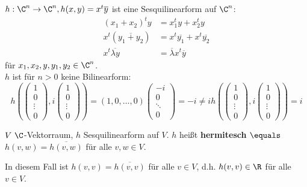 \documentclass{article}
\begin{document}
    \begin{bsp}
        \label{examplesesqui}
        $h: \C^n \to \C ^n, h(x, y) = x^t \overline{y}$ ist eine Sesquilinearform auf $\C^n$:
        \begin{align*}
            (x_1 + x_2)^t y &= x_1^t y+ x_2^t y\\
            x^t(\overline{y_1 + y_2}) &= x^t \overline{y_1} + x^t\overline{y_2}\\
            x^t\overline{\lambda y} &= \overline{\lambda} x^t \overline{y}
        \end{align*}
        für $x_1, x_2, y, y_1, y_2 \in \C^n$.\\
        $h$ ist für $n>0$ keine Bilinearform:
        $$h\left(\begin{pmatrix}
            1 \\ 0 \\ \vdots \\ 0
        \end{pmatrix}, i \begin{pmatrix}
            1 \\ 0 \\ \vdots \\ 0
        \end{pmatrix}\right) = (1,0, \dots, 0)\begin{pmatrix}
            -i \\ 0 \\ \ddots \\ 0
        \end{pmatrix}
        = -i \neq i h\left(\begin{pmatrix}
            1 \\ 0 \\ \vdots \\ 0
        \end{pmatrix}, i \begin{pmatrix}
            1 \\ 0 \\ \vdots \\ 0
        \end{pmatrix}\right) = i$$
    \end{bsp}
    \begin{definition}  
        $V\ \C$-Vektorraum, $h$ Sesquilinearform auf $V$.
        $h$ heißt \textbf{hermitesch} $\equals$ $h(v,w) = \overline{h(v,w)}$ für alle $v, w\in V$.
    \end{definition}
    \begin{anmerkung}
        In diesem Fall ist $h(v,v) = \overline{h(v,v)}$ für alle $v \in V$, d.h. $h(v,v) \in \R$ für alle $v\in V$.
    \end{anmerkung}
\end{document}
